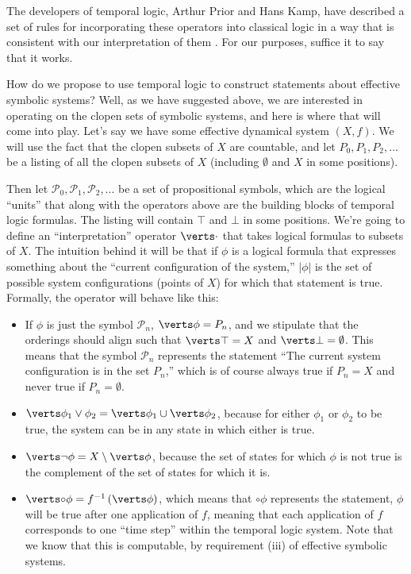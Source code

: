 \documentclass{fkpaper}
\newcommand{\lnext}{\circ}
\newcommand{\psc}{\mathcal{P}}
\begin{document}
\begin{multicols}{2}
The developers of temporal logic, Arthur Prior and Hans Kamp, have described a set of rules for incorporating these operators into classical logic in a way that is consistent with our interpretation of them \cite{Delvenne2004Apr}. For our purposes, suffice it to say that it works.

How do we propose to use temporal logic to construct statements about effective symbolic systems? Well, as we have suggested above, we are interested in operating on the clopen sets of symbolic systems, and here is where that will come into play. Let's say we have some effective dynamical system $(X, f)$. We will use the fact that the clopen subsets of $X$ are countable, and let $P_0, P_1, P_2, ...$ be a listing of all the clopen subsets of $X$ (including $\emptyset$ and $X$ in some positions).

Then let $\psc_0, \psc_1, \psc_2, ...$ be a set of propositional symbols, which are the logical ``units'' that along with the operators above are the building blocks of temporal logic formulas. The listing will contain $\top$ and $\bot$ in some positions. We're going to define an ``interpretation'' operator $\abs{\cdot}$ that takes logical formulas to subsets of $X$. The intuition behind it will be that if $\phi$ is a logical formula that expresses something about the ``current configuration of the system,'' $|\phi|$ is the set of possible system configurations (points of $X$) for which that statement is true. Formally, the operator will behave like this:

\begin{itemize}
  \item If $\phi$ is just the symbol $\psc_n$, $\abs{\phi} = P_n$, and we stipulate that the orderings should align such that $\abs{\top} = X$ and $\abs{\bot} = \emptyset$. This means that the symbol $\psc_n$ represents the statement ``The current system configuration is in the set $P_n$,'' which is of course always true if $P_n = X$ and never true if $P_n = \emptyset$.

  \item $\abs{\phi_1 \lor \phi_2} = \abs{\phi_1} \cup \abs{\phi_2}$, because for either $\phi_1$ or $\phi_2$ to be true, the system can be in any state in which either is true.

  \item $\abs{\lnot \phi} = X \setminus \abs{\phi}$, because the set of states for which $\phi$ is not true is the complement of the set of states for which it is.

  \item $\abs{\lnext \phi} = f^{-1}\left( \abs{\phi} \right)$, which means that $\lnext \phi$ represents the statement, $\phi$ will be true after one application of $f$, meaning that each application of $f$ corresponds to one ``time step'' within the temporal logic system. Note that we know that this is computable, by requirement (iii) of effective symbolic systems.


\end{itemize}
\end{multicols}
\end{document}
